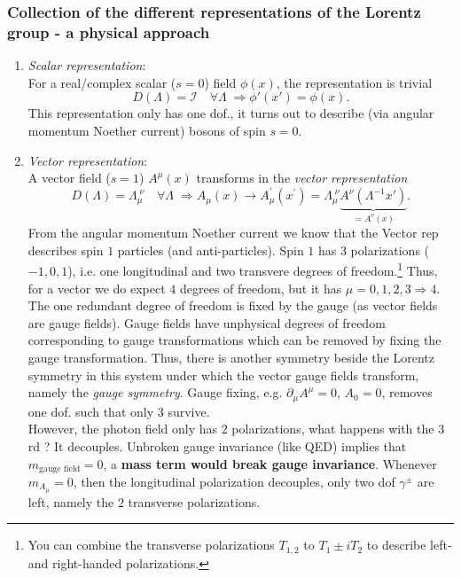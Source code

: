 \subsubsection{Collection of the different representations of the Lorentz group - a physical approach}
\begin{enumerate}
	\item \emph{Scalar representation}:\\
	
		For a real/complex scalar ($s=0$) field $\phi(x)$, the representation is trivial 
	\begin{equation}
	D(\Lambda) = \mathcal{I} \quad \forall \Lambda \; \Rightarrow \phi'(x')=\phi(x).
	\end{equation}
	This representation only has one dof., it turns out to describe (via angular momentum Noether current) bosons of spin $s=0$.
	\item \emph{Vector representation}:\\
		A vector field ($s=1$) $A^{\mu}(x)$ transforms in the \emph{vector representation} 
	\begin{equation}
	D(\Lambda) = \Lambda^{\;\nu}_{\mu} \quad \forall \Lambda \; \Rightarrow A_{\mu}(x)\rightarrow A^\prime_\mu(x^\prime) = \Lambda^{\;\nu}_\mu \underbrace{A^{\nu}(\Lambda^{-1}x' )}_{=A^\nu(x)}.
	\end{equation}
	From the angular momentum Noether current we know that the Vector rep describes spin $1$ particles (and anti-particles). Spin $1$ has $3$ polarizations ($-1,0,1$), i.e. one longitudinal and two transvere degrees of freedom.\footnote{You can combine the transverse polarizations $T_{1,2}$ to $T_1\pm i T_2$ to describe left-and right-handed polarizations.} Thus, for a vector we do expect $4$ degrees of freedom, but it has $\mu=0,1,2,3 \Rightarrow 4$. The one redundant degree of freedom is fixed by the gauge (as vector fields are gauge fields). Gauge fields have unphysical degrees of freedom corresponding to gauge transformations which can be removed by fixing the gauge transformation. Thus, there is another symmetry beside the Lorentz symmetry in this system under which the vector gauge fields transform, namely the \emph{gauge symmetry}. Gauge fixing, e.g. $\partial_\mu A^\mu=0$, $A_0=0$, removes one dof. such that only $3$ survive.\\
	 However, the photon field only has $2$ polarizations, what happens with the $3$rd ? It decouples. Unbroken gauge invariance (like QED) implies that $m_{\text{gauge field}}=0$, a \textbf{mass term would break gauge invariance}. Whenever $m_{A_\mu}=0$, then the longitudinal polarization decouples, only two dof $\gamma^\pm$ are left, namely the $2$ transverse polarizations.\\

\end{enumerate}

